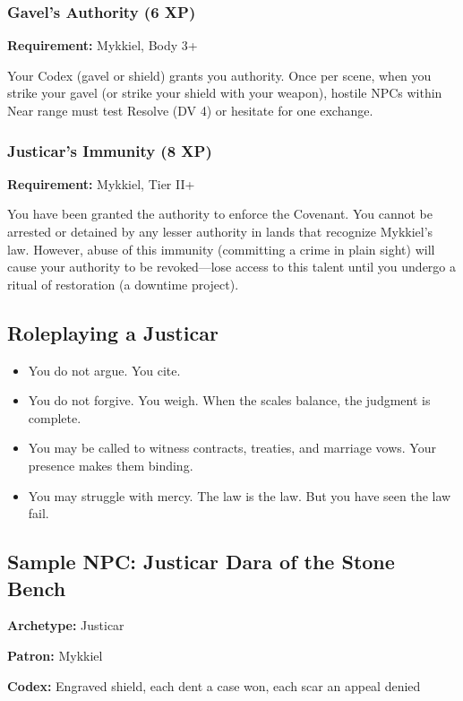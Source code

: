 \subsubsection{Gavel's Authority (6 XP)}

\textbf{Requirement:} Mykkiel, Body 3+

Your Codex (gavel or shield) grants you authority. Once per scene, when you strike your gavel (or strike your shield with your weapon), hostile NPCs within Near range must test Resolve (DV 4) or hesitate for one exchange.

\subsubsection{Justicar's Immunity (8 XP)}

\textbf{Requirement:} Mykkiel, Tier II+

You have been granted the authority to enforce the Covenant. You cannot be arrested or detained by any lesser authority in lands that recognize Mykkiel's law. However, abuse of this immunity (committing a crime in plain sight) will cause your authority to be revoked—lose access to this talent until you undergo a ritual of restoration (a downtime project).

\subsection{Roleplaying a Justicar}

\begin{itemize}
\item You do not argue. You cite.
\item You do not forgive. You weigh. When the scales balance, the judgment is complete.
\item You may be called to witness contracts, treaties, and marriage vows. Your presence makes them binding.
\item You may struggle with mercy. The law is the law. But you have seen the law fail.
\end{itemize}

\subsection{Sample NPC: Justicar Dara of the Stone Bench}

\textbf{Archetype:} Justicar

\textbf{Patron:} Mykkiel

\textbf{Codex:} Engraved shield, each dent a case won, each scar an appeal denied

